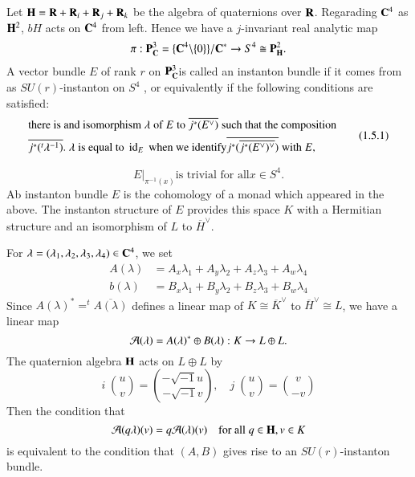 Let $\mathbf{H} =\mathbf{R} +\mathbf{R}_{i} + \mathbf{R}_{j} + \mathbf{R}_{k}$ be the algebra of quaternions over $\mathbf{R}$. Regarading $\mathbf{C}^{4}$ as $\mathbf{H}^{2}$, $bH$ acts on $\mathbf{C}^{4}$ from left. Hence we have a $j$-invariant real analytic map
$$
\pi : \mathbf{P}^{3}_{\mathbf{C}} = \{\mathbf{C}^{4}\backslash \{0\}\}/{\mathbf{C}}^{*} \rightarrow S^{4} \cong \mathbf{P}_{\mathbf{H}}^{2}.
$$
A vector bundle $E$ of rank $r$ on $\mathbf{P}_{\mathbf{C}}^{3}$is called an instanton bundle if it comes from as $SU(r)$-instanton on $S^{4}$ , or equivalently if the following conditions are satisfied:
\begin{equation}
\begin{aligned}
&\text{there is and isomorphism} \;\lambda\; \text{of} \;E\; \text{to} \;\overline{j^{*}(E^{\vee})}\; \text{such that the composition}\\
&\overline{j^{*}(^{t}\lambda^{-1})}.\; \lambda \;\text{is equal to} \;\operatorname{id}_{E} \;\text{when we identify} \overline{j^{*}(\overline{j^{*}(E^{\vee})^{\vee}})}\; \text{with}\; E,
\end{aligned}\tag{1.5.1}\label{chap12-eq-1.5.1} 
\end{equation}

\begin{equation}
E|_{\pi^{-1}(x)} \text{is trivial for all} x \in S^{4}.\tag{1.5.2}\label{chap12-eq-1.5.2} 
\end{equation}
Ab instanton bundle $E$ is the cohomology of a monad which appeared in the above. The instanton structure of $E$ provides this space $K$ with a Hermitian structure and an isomorphism of $L$ to $\overline{H}^{\vee}$.

For  $\lambda =(\lambda_{1}, \lambda_{2}, \lambda_{3}, \lambda_{4}) \in \mathbf{C}^{4}$, we set
\begin{align*}
A(\lambda) &= A_{x}\lambda_{1} + A_{y}\lambda_{2} +A_{z}\lambda_{3} + A_{w}\lambda_{4}\\
b(\lambda) &= B_{x}\lambda_{1} + B_{y}\lambda_{2} +B_{z}\lambda_{3} + B_{w}\lambda_{4}
\end{align*}
Since $A(\lambda)^{*} = ^{t}\overline{A(\lambda)}$ defines a linear map of $K \cong\overline{K}^{\vee}$ to
$\overline{H}^{\vee} \cong L$, we have a linear map
$$
\mathcal{A}(\lambda) = A(\lambda)^{*} \oplus B(\lambda) : K \rightarrow L \oplus L.
$$
The quaternion algebra $\mathbf{H}$ acts on $L \oplus L$ by
$$
i \;\binom{u}{v} = \binom{-\sqrt{-1}u}{-\sqrt{-1}v}, \quad j\; \binom{u}{v}= \binom{v}{-v}
$$ 
Then the condition that
$$
\mathcal{A}(q\lambda)(v)=q \mathcal{A}(\lambda)(v)\quad \text{for all}\; q \in \mathbf{H}, v \in K
$$
is equivalent to the condition that $(A, B)$ gives rise to an $SU(r)$-instanton bundle.

